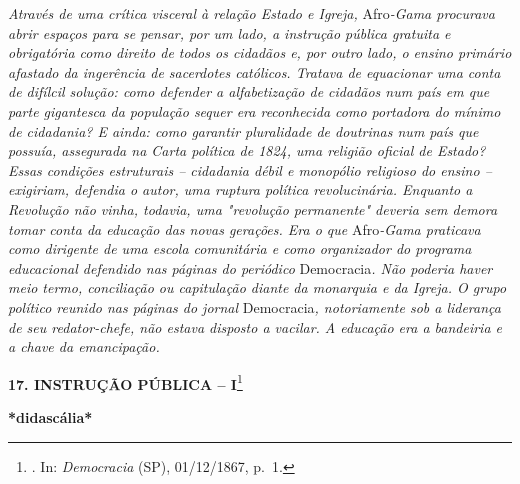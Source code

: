 \emph{Através de uma crítica visceral à relação Estado e Igreja,}
Afro\emph{-Gama procurava abrir espaços para se pensar, por um lado, a
instrução pública gratuita e obrigatória como direito de todos os
cidadãos e, por outro lado, o ensino primário afastado da ingerência de
sacerdotes católicos. Tratava de equacionar uma conta de difílcil
solução: como defender a alfabetização de cidadãos num país em que parte
gigantesca da população sequer era reconhecida como portadora do mínimo
de cidadania? E ainda: como garantir pluralidade de doutrinas num país
que possuía, assegurada na Carta política de 1824, uma religião oficial
de Estado? Essas condições estruturais -- cidadania débil e monopólio
religioso do ensino -- exigiriam, defendia o autor, uma ruptura política
revolucinária. Enquanto a Revolução não vinha, todavia, uma "revolução
permanente" deveria sem demora tomar conta da educação das novas
gerações. Era o que} Afro\emph{-Gama praticava como dirigente de uma
escola comunitária e como organizador do programa educacional defendido
nas páginas do periódico} Democracia\emph{. Não poderia haver meio
termo, conciliação ou capitulação diante da monarquia e da Igreja. O
grupo político reunido nas páginas do jornal} Democracia\emph{,
notoriamente sob a liderança de seu redator-chefe, não estava disposto a
vacilar. A educação era a bandeiria e a chave da emancipação.}

\textbf{17. INSTRUÇÃO PÚBLICA -- I}\footnote{. In: \emph{Democracia}
  (SP), 01/12/1867, p.~1.}

\textbf{*didascália*}

